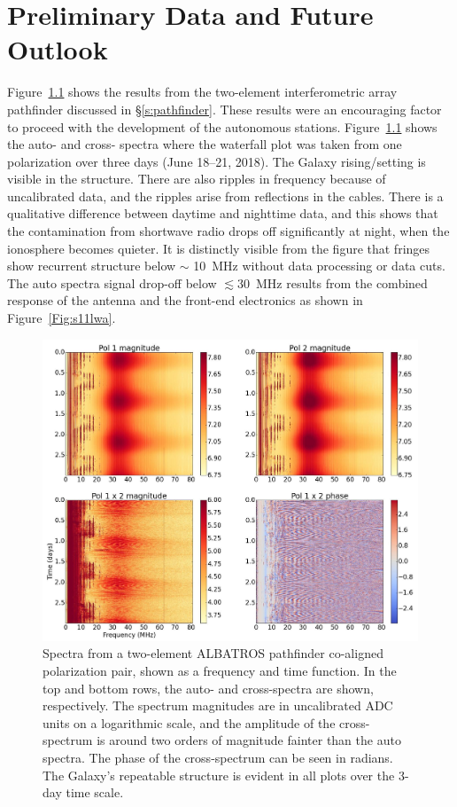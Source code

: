 \chapter{Preliminary Data and Future Outlook}\label{s:Prel}

Figure~\ref{Fig:pathfinderresults} shows the results from the two-element interferometric array pathfinder discussed in \S\ref{s:pathfinder}. These results were an encouraging factor to proceed with the development of the autonomous stations.  Figure~\ref{Fig:pathfinderresults} shows the auto- and cross- spectra where the waterfall plot was taken from one polarization over three days (June 18–21, 2018). The Galaxy rising/setting is visible in the structure. There are also ripples in frequency because of uncalibrated data, and the ripples arise from reflections in the cables. There is a qualitative difference between daytime and nighttime data, and this shows that the contamination from shortwave radio drops off significantly at night, when the ionosphere becomes quieter. It is distinctly visible from the figure that fringes show recurrent structure below $\sim$ \SI{10}{\mega\hertz} without data processing or data cuts. The auto spectra signal drop-off below $\lesssim$\SI{ 30}{\mega\hertz} results from the combined response of the antenna and the front-end electronics as shown in Figure~\ref{Fig:s11lwa}.

\begin{figure}
	\centering
	\includegraphics[width=0.9\linewidth]{"Figures/pathfinder results"}
	\caption{Spectra from a two-element ALBATROS pathfinder co-aligned polarization pair, shown as a frequency and time function. In the top and bottom rows, the auto- and cross-spectra are shown, respectively. The spectrum magnitudes are in uncalibrated ADC units on a logarithmic scale, and the amplitude of the cross-spectrum is around two orders of magnitude fainter than the auto spectra. The phase of the cross-spectrum can be seen in radians. The Galaxy's repeatable structure is evident in all plots over the 3-day time scale.}
	\label{Fig:pathfinderresults}
\end{figure}

